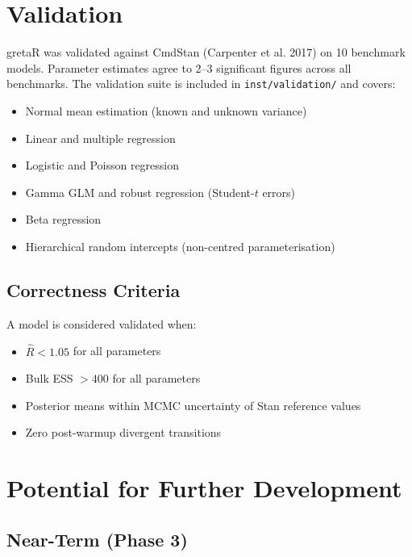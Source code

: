 \documentclass[
  11pt,
]{article}
\providecommand{\tightlist}{%
  \setlength{\itemsep}{0pt}\setlength{\parskip}{0pt}}
\begin{document}
\section{Validation}\label{validation}

gretaR was validated against CmdStan (Carpenter et al. 2017) on 10
benchmark models. Parameter estimates agree to 2--3 significant figures
across all benchmarks. The validation suite is included in
\texttt{inst/validation/} and covers:

\begin{itemize}
\tightlist
\item
  Normal mean estimation (known and unknown variance)
\item
  Linear and multiple regression
\item
  Logistic and Poisson regression
\item
  Gamma GLM and robust regression (Student-\(t\) errors)
\item
  Beta regression
\item
  Hierarchical random intercepts (non-centred parameterisation)
\end{itemize}

\subsection{Correctness Criteria}\label{correctness-criteria}

A model is considered validated when:

\begin{itemize}
\tightlist
\item
  \(\hat{R} < 1.05\) for all parameters
\item
  Bulk ESS \(> 400\) for all parameters
\item
  Posterior means within MCMC uncertainty of Stan reference values
\item
  Zero post-warmup divergent transitions
\end{itemize}

\section{Potential for Further
Development}\label{potential-for-further-development}

\subsection{Near-Term (Phase 3)}\label{near-term-phase-3}
\end{document}
